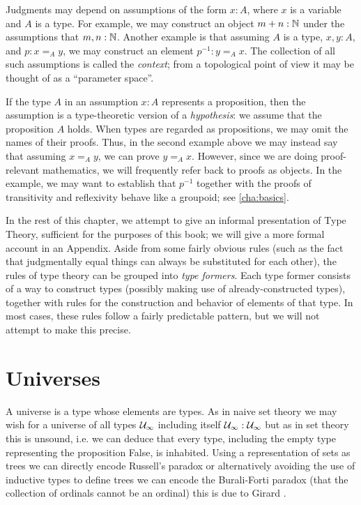 Judgments may depend on assumptions of the form $x:A$, where $x$ is a variable and $A$ is a type.
For example, we may construct an object $m + n : \mathbb{N}$ under the assumptions that $m,n : \mathbb{N}$.
Another example is that assuming $A$ is a type, $x,y : A$, and $p : x =_A y$, we may construct an element $p^{-1} : y =_A x$.
The collection of all such assumptions is called the \emph{context}; from a topological point of view it may be thought of as a ``parameter space''.

If the type $A$ in an assumption $x:A$ represents a proposition, then the assumption is a type-theoretic version of a \emph{hypothesis}: we assume that the proposition $A$ holds.
When types are regarded as propositions, we may omit the names of their proofs.
Thus, in the second example above we may instead say that assuming $x =_A y$, we can prove $y =_A x$.
However, since we are doing proof-relevant mathematics, we will frequently refer back to proofs as objects.
In the example, we may want to establish that $p^{-1}$ together with the proofs of transitivity and reflexivity behave like a groupoid; see \autoref{cha:basics}.

In the rest of this chapter, we attempt to give an informal presentation of Type Theory, sufficient for the purposes of this book; we will give a more formal account in an Appendix.
Aside from some fairly obvious rules (such as the fact that judgmentally equal things can always be substituted for each other), the rules of type theory can be grouped into \emph{type formers}.
Each type former consists of a way to construct types (possibly making use of already-constructed types), together with rules for the construction and behavior of elements of that type.
In most cases, these rules follow a fairly predictable pattern, but we will not attempt to make this precise.


\section{Universes}
\label{sec:universes}

A universe is a type whose elements are types. As in naive set theory
we may wish for a universe of all types $\mathcal{U}_\infty$ including itself
$\mathcal{U}_\infty : \mathcal{U}_\infty$ but as in set
theory this is unsound, i.e. we can deduce that every type,
including the empty type representing the proposition False, is inhabited. Using a
representation of sets as trees we can directly encode Russell's
paradox \cite{thierry:trees} or alternatively avoiding the use of
inductive types to define trees we can encode the Burali-Forti paradox
(that the collection of ordinals cannot be an ordinal) this is due to
Girard \cite{girard:paradox}.

